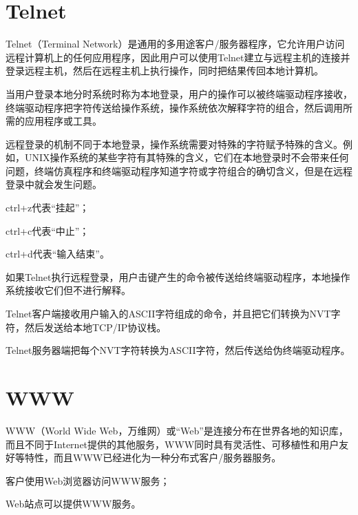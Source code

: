 \chapter{Telnet}



Telnet（Terminal Network）是通用的多用途客户/服务器程序，它允许用户访问远程计算机上的任何应用程序，因此用户可以使用Telnet建立与远程主机的连接并登录远程主机，然后在远程主机上执行操作，同时把结果传回本地计算机。


当用户登录本地分时系统时称为本地登录，用户的操作可以被终端驱动程序接收，终端驱动程序把字符传送给操作系统，操作系统依次解释字符的组合，然后调用所需的应用程序或工具。

远程登录的机制不同于本地登录，操作系统需要对特殊的字符赋予特殊的含义。例如，UNIX操作系统的某些字符有其特殊的含义，它们在本地登录时不会带来任何问题，终端仿真程序和终端驱动程序知道字符或字符组合的确切含义，但是在远程登录中就会发生问题。

\begin{compactitem}
\item ctrl+z代表“挂起”；
\item ctrl+c代表“中止”；
\item ctrl+d代表“输入结束”。
\end{compactitem}

如果Telnet执行远程登录，用户击键产生的命令被传送给终端驱动程序，本地操作系统接收它们但不进行解释。

\begin{compactitem}
\item Telnet客户端接收用户输入的ASCII字符组成的命令，并且把它们转换为NVT字符，然后发送给本地TCP/IP协议栈。
\item Telnet服务器端把每个NVT字符转换为ASCII字符，然后传送给伪终端驱动程序。
\end{compactitem}

\chapter{WWW}


WWW（World Wide Web，万维网）或“Web”是连接分布在世界各地的知识库，而且不同于Internet提供的其他服务，WWW同时具有灵活性、可移植性和用户友好等特性，而且WWW已经进化为一种分布式客户/服务器服务。

\begin{compactitem}
\item 客户使用Web浏览器访问WWW服务；
\item Web站点可以提供WWW服务。
\end{compactitem}

